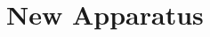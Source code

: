 \appendix
\renewcommand{\thechapter}{C}
\renewcommand{\chaptername}{Appendix}

\chapter{New Apparatus}
\label{app:Basement_lab}

